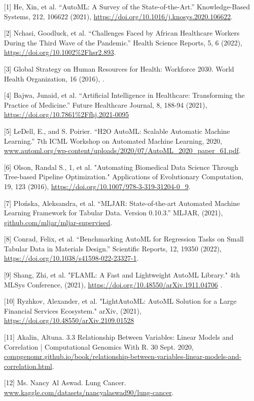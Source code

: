 \documentclass{article}
\begin{document}
\medskip
{
\small

[1] He, Xin, et al. “AutoML: A Survey of the State-of-the-Art.” Knowledge-Based Systems, 212, 106622 (2021), \url{https://doi.org/10.1016/j.knosys.2020.106622}. 

[2] Nchasi, Goodluck, et al. “Challenges Faced by African Healthcare Workers During the Third Wave of the Pandemic.” Health Science Reports, 5, 6 (2022), \url{https://doi.org/10.1002%2Fhsr2.893}.

[3] Global Strategy on Human Resources for Health: Workforce 2030. World Health Organization, 16 (2016), \url{}.

[4] Bajwa, Junaid, et al. “Artificial Intelligence in Healthcare: Transforming the Practice of Medicine.” Future Healthcare Journal, 8, 188-94 (2021), \url{https://doi.org/10.7861%2Ffhj.2021-0095} 

[5] LeDell, E., and S. Poirier. “H2O AutoML: Scalable Automatic Machine Learning.” 7th ICML Workshop on Automated Machine Learning, 2020, \url{www.automl.org/wp-content/uploads/2020/07/AutoML_2020_paper_61.pdf}.

[6] Olson, Randal S., 1, et al. "Automating Biomedical Data Science Through Tree-based Pipeline Optimization." Applications of Evolutionary Computation, 19, 123 (2016), \url{https://doi.org/10.1007/978-3-319-31204-0_9}.

[7] P\l{}o\'{n}ska, Aleksandra, et al. “MLJAR: State-of-the-art Automated Machine Learning Framework for Tabular Data.  Version 0.10.3.” MLJAR, (2021), \url{github.com/mljar/mljar-supervised}.

[8] Conrad, Felix, et al. “Benchmarking AutoML for Regression Tasks on Small Tabular Data in Materials Design.” Scientific Reports, 12, 19350 (2022), \url{https://doi.org/10.1038/s41598-022-23327-1}.

[9] Shang, Zhi, et al. "FLAML: A Fast and Lightweight AutoML Library." 4th MLSys Conference, (2021), \url{https://doi.org/10.48550/arXiv.1911.04706} .

[10] Ryzhkov, Alexander, et al. "LightAutoML: AutoML Solution for a Large Financial Services Ecosystem." arXiv, (2021), \url{https://doi.org/10.48550/arXiv.2109.01528}

[11] Akalin, Altuna. 3.3 Relationship Between Variables: Linear Models and Correlation | Computational Genomics With R. 30 Sept. 2020, \url{compgenomr.github.io/book/relationship-between-variables-linear-models-and-correlation.html}.

[12] Ms. Nancy Al Aswad. Lung Cancer. \url{www.kaggle.com/datasets/nancyalaswad90/lung-cancer}.

}
\end{document}
